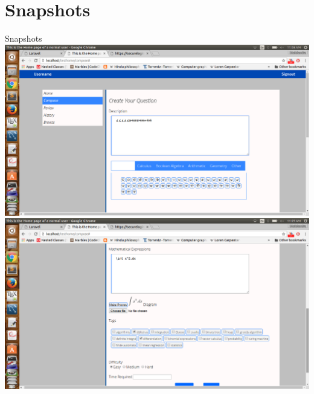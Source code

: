 \documentclass[10pt, a4paper]{beamer}
\begin{document}
\section{Snapshots}
\begin{frame}{Snapshots}
	\includegraphics[scale=0.08]{photo1.png}\hspace{1cm}\includegraphics[scale=0.08]{photo2.png}\\

\end{frame}
\end{document}
